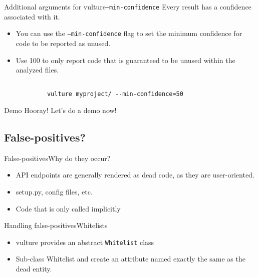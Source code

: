 \documentclass{beamer}
\begin{document}
\begin{frame}{Additional arguments for vulture}{\texttt{--min-confidence}}
    Every result has a confidence associated with it.
    \begin{itemize}
        \item
            You can use the \texttt{--min-confidence} flag to set the minimum confidence for code to be reported as unused.
        \item
            Use  100 to only report code that is \alert{guaranteed} to be unused within the analyzed files.
    \end{itemize}
    
    \begin{example}
        \begin{verbatim}

            vulture myproject/ --min-confidence=50

        \end{verbatim}
    \end{example}
\end{frame}

\begin{frame}{Demo}
    \alert{Hooray! Let's do a demo now!}
    
\end{frame}

\subsection{False-positives?}

\begin{frame}{False-positives}{Why do they occur?}
    \begin{itemize}
        \item
            API endpoints are generally rendered as dead code, as they are user-oriented.
        \pause
        \item
            setup.py, config files, etc.
        \pause
        \item
            Code that is only called implicitly
    \end{itemize}
\end{frame}

\begin{frame}{Handling false-positives}{Whitelists}
    \begin{itemize}
        \item
            vulture provides an abstract \texttt{Whitelist} class
        \item
            Sub-class \alert{Whitelist} and create an attribute named exactly the same as the dead entity.
    \end{itemize}
\end{frame}
\end{document}

